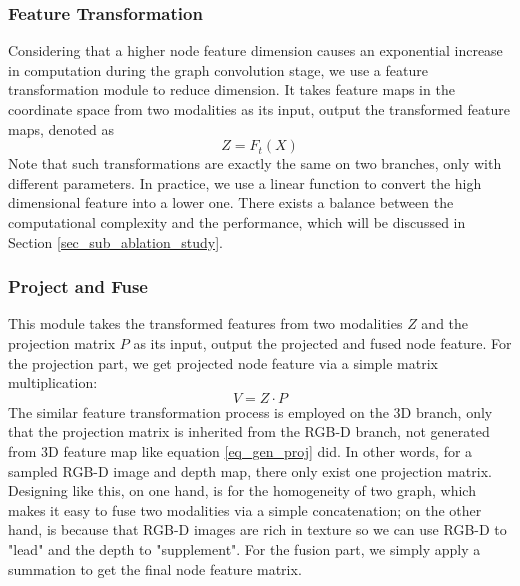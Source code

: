 ﻿\documentclass[journal]{IEEEtran}
\begin{document}
    

\subsubsection{Feature Transformation} \label{sec_sub_feature_transofrm}
    Considering that a higher node feature dimension causes an exponential increase in computation during the graph convolution stage, we use a feature transformation module to reduce dimension. It takes feature maps in the coordinate space from two modalities as its input, output the transformed feature maps, denoted as
    \begin{equation}
     Z = F_t(X)
    \end{equation}
    Note that such transformations are exactly the same on two branches, only with different parameters. In practice, we use a linear function to convert the high dimensional feature into a lower one. There exists a balance between the computational complexity and the performance, which will be discussed in Section \ref{sec_sub_ablation_study}. 

\subsubsection{Project and Fuse}
       
    This module takes the transformed features from two modalities $Z$ and the projection matrix $P$ as its input, output the projected and fused node feature. For the projection part, we get projected node feature via a simple matrix multiplication:
    \begin{equation} 
        V = Z \cdot P
        \label{eq_node_embedding}
    \end{equation}
    The similar feature transformation process is employed on the 3D branch, only that the projection matrix is inherited from the RGB-D branch, not generated from 3D feature map like equation \ref{eq_gen_proj} did. In other words, for a sampled RGB-D image and depth map, there only exist one projection matrix. Designing like this, on one hand, is for the homogeneity of two graph, which makes it easy to fuse two modalities via a simple concatenation; on the other hand, is because that RGB-D images are rich in texture so we can use RGB-D to "lead" and the depth to "supplement". For the fusion part, we simply apply a summation to get the final node feature matrix.  \\

    
   
\end{document}
